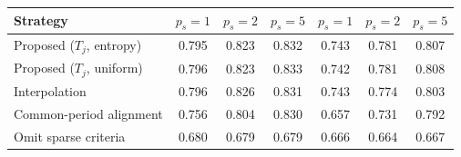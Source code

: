 \begin{tabular}{lcccccc}
\toprule
Strategy & $p_s{=}1$ & $p_s{=}2$ & $p_s{=}5$ & $p_s{=}1$ & $p_s{=}2$ & $p_s{=}5$ \\
\midrule
Proposed ($T_j$, entropy) & 0.795 & 0.823 & 0.832 & 0.743 & 0.781 & 0.807 \\
Proposed ($T_j$, uniform) & 0.796 & 0.823 & 0.833 & 0.742 & 0.781 & 0.808 \\
Interpolation & 0.796 & 0.826 & 0.831 & 0.743 & 0.774 & 0.803 \\
Common-period alignment & 0.756 & 0.804 & 0.830 & 0.657 & 0.731 & 0.792 \\
Omit sparse criteria & 0.680 & 0.679 & 0.679 & 0.666 & 0.664 & 0.667 \\
\bottomrule
\end{tabular}
